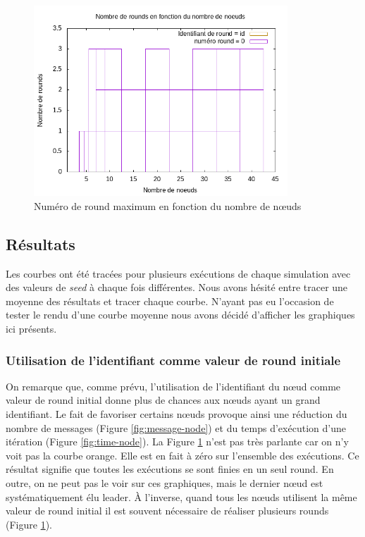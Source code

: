 \documentclass[french]{article}
\begin{document}
\begin{figure}[ht]
	\centering
	\includegraphics[width=0.85\textwidth]{NoeudsRounds.png} %
	\caption{Numéro de round maximum en fonction du nombre de nœuds}
	\label{fig:round-node}
\end{figure}

\subsection{Résultats}

Les courbes ont été tracées pour plusieurs exécutions de chaque simulation avec des valeurs de \emph{seed} à chaque fois différentes.
Nous avons hésité entre tracer une moyenne des résultats et tracer chaque courbe.
N'ayant pas eu l'occasion de tester le rendu d'une courbe moyenne nous avons décidé d'afficher les graphiques ici présents.

\subsubsection{Utilisation de l'identifiant comme valeur de round initiale}

On remarque que, comme prévu, l'utilisation de l'identifiant du nœud comme valeur de round initial donne plus de chances aux nœuds ayant un grand identifiant.
Le fait de favoriser certains nœuds provoque ainsi une réduction du nombre de messages (Figure \ref{fig:message-node}) et du temps d'exécution d'une itération (Figure \ref{fig:time-node}).
La Figure \ref{fig:round-node} n'est pas très parlante car on n'y voit pas la courbe orange. Elle est en fait à zéro sur l'ensemble des exécutions.
Ce résultat signifie que toutes les exécutions se sont finies en un seul round.
En outre, on ne peut pas le voir sur ces graphiques, mais le dernier nœud est systématiquement élu leader.
À l'inverse, quand tous les nœuds utilisent la même valeur de round initial il est souvent nécessaire de réaliser plusieurs rounds (Figure \ref{fig:round-node}).
\end{document}
